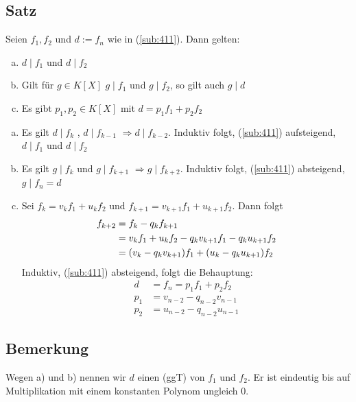 \subsection[Satz über die Eigenschaften des Ergebnisses des Euklid'schen Algorithmus]{Satz} %
\label{sub:413}
Seien $f_1, f_2$ und $d := f_n$ wie in (\ref{sub:411}). Dann gelten:
\begin{enumerate}[a)]
	\item $d \mid f_1$ und $d \mid f_2$
	\item Gilt für $g \in K[X]$ $g \mid f_1 $ und $ g\mid f_2$, so gilt auch $g \mid d$
	\item \label{413:enum:c} Es gibt $p_1, p_2 \in K[X]$ mit $d= p_1f_1 + p_2f_2$
\end{enumerate}
\begin{enumerate}[a)]
	\item Es gilt $d\mid f_k$ , $d\mid f_{k-1}$ $\Rightarrow d\mid f_{k-2}$. Induktiv folgt, (\ref{sub:411}) aufsteigend, $d\mid f_1$ und $d\mid f_2$
	\item Es gilt $g\mid f_k$ und $g\mid f_{k+1}$ $\Longrightarrow g\mid f_{k+2}$. Induktiv folgt, (\ref{sub:411}) absteigend, $g\mid f_n = d$
	\item Sei $f_k = v_k f_1 + u_k f_2$ und $f_{k+1}= v_{k+1}f_1 + u_{k+1}f_2$. Dann folgt 
	\begin{align*}
		f_{k+2} &= f_k - q_k f_{k+1} \\
		&= v_k f_1 + u_k f_2 - q_k v_{k+1} f_1 - q_k u_{k+1} f_2 \\
		&= \enbrace*{v_k - q_k v_{k+1}}f_1  +  \enbrace*{u_k - q_k u_{k+1}}f_2 
	\end{align*}
	Induktiv, (\ref{sub:411}) absteigend, folgt die Behauptung:
	\begin{align*}
		d &= f_n = p_1 f_1 + p_2 f_2 \\
		p_1 &= v_{n-2} - q_{n-2}v_{n-1} \\
		p_2 &= u_{n-2} - q_{n-2} u_{n-1} \tag*{$\square$}
	\end{align*}
\end{enumerate}


\subsection[Bemerkung größter gemeinsamer Teiler (ggT)]{Bemerkung} %
\label{sub:414}
Wegen a) und b) nennen wir $d$ einen (ggT) von $f_1$ und $f_2$. Er ist eindeutig bis auf Multiplikation
mit einem konstanten Polynom ungleich $0$.

